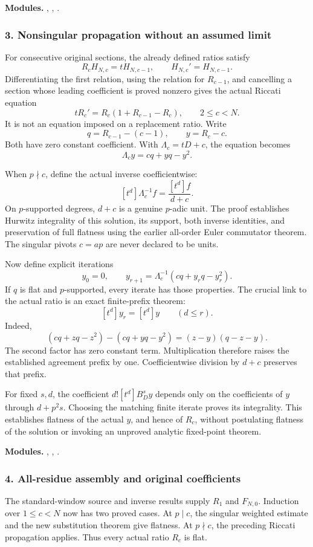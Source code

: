 \textbf{Modules.} , , .
\par\medskip
\subsubsection*{3. Nonsingular propagation without an assumed limit}
For consecutive original sections, the already defined ratios satisfy
\[
 R_cH_{N,c}=tH_{N,c-1},\qquad H_{N,c}'=H_{N,c-1}.
\]
Differentiating the first relation, using the relation for $R_{c-1}$, and cancelling a section whose leading coefficient is proved nonzero gives the actual Riccati equation
\[
 \boxed{tR_c'=R_c(1+R_{c-1}-R_c),\qquad 2\le c<N.}
\]
It is not an equation imposed on a replacement ratio. Write
\[
 q=R_{c-1}-(c-1),\qquad y=R_c-c.
\]
Both have zero constant coefficient. With $\Lambda_c=tD+c$, the equation becomes
\[
 \boxed{\Lambda_c y=cq+yq-y^2.}
\]

When $p\nmid c$, define the actual inverse coefficientwise:
\[
 [t^d]\Lambda_c^{-1}f=\frac{[t^d]f}{d+c}.
\]
On $p$-supported degrees, $d+c$ is a genuine $p$-adic unit. The proof establishes Hurwitz integrality of this solution, its support, both inverse identities, and preservation of full flatness using the earlier all-order Euler commutator theorem. The singular pivots $c=ap$ are never declared to be units.

Now define explicit iterations
\[
 y_0=0,\qquad y_{r+1}=\Lambda_c^{-1}(cq+y_rq-y_r^2).
\]
If $q$ is flat and $p$-supported, every iterate has those properties. The crucial link to the actual ratio is an exact finite-prefix theorem:
\[
 \boxed{[t^d]y_r=[t^d]y\qquad(d\le r).}
\]
Indeed,
\[
 (cq+zq-z^2)-(cq+yq-y^2)=(z-y)(q-z-y).
\]
The second factor has zero constant term. Multiplication therefore raises the established agreement prefix by one. Coefficientwise division by $d+c$ preserves that prefix.

For fixed $s,d$, the coefficient $d![t^d]B_D^sy$ depends only on the coefficients of $y$ through $d+p^2s$. Choosing the matching finite iterate proves its integrality. This establishes flatness of the actual $y$, and hence of $R_c$, without postulating flatness of the solution or invoking an unproved analytic fixed-point theorem.

\textbf{Modules.} , , .
\par\medskip
\subsubsection*{4. All-residue assembly and original coefficients}
The standard-window source and inverse results supply $R_1$ and $F_{N,0}$. Induction over $1\le c<N$ now has two proved cases. At $p\mid c$, the singular weighted estimate and the new substitution theorem give flatness. At $p\nmid c$, the preceding Riccati propagation applies. Thus every actual ratio $R_c$ is flat.

